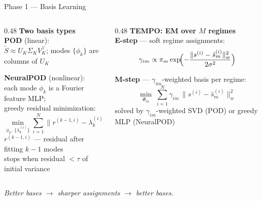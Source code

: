 \documentclass[aspectratio=169]{beamer}
\begin{document}
\begin{frame}{Phase 1 — Basis Learning}

\begin{columns}[T]
\begin{column}{0.48\textwidth}
  \small\textbf{Two basis types}\\[6pt]

  \textbf{POD} (linear):\\
  $\tilde{S} \approx U_K\Sigma_K V_K^\top$;\enspace
  modes $\{\phi_k\}$ are columns of $U_K$

  \medskip
  \textbf{NeuralPOD} (nonlinear):\\
  each mode $\phi_k$ is a Fourier feature MLP;\\
  greedy residual minimization:
  \[
    \min_{\phi_k,\,\{\lambda_k^{(i)}\}}
    \sum_{i=1}^N \bigl\|r^{(k-1,i)} - \lambda_k^{(i)}\phi_k\bigr\|_w^2
  \]
  {\footnotesize $r^{(k-1,i)}$ — residual after fitting $k{-}1$ modes}\\[2pt]
  stops when residual $<\tau$ of initial variance
\end{column}
\begin{column}{0.48\textwidth}
  \small\textbf{TEMPO: EM over $M$ regimes}\\[6pt]

  \textbf{E-step} — soft regime assignments:
  \[
    \gamma_{im} \propto \pi_m
    \exp\!\Bigl(-\frac{\|s^{(i)}-\hat{s}_m^{(i)}\|_w^2}{2\sigma^2}\Bigr)
  \]

  \medskip
  \textbf{M-step} — $\gamma_{im}$-weighted basis per regime:
  \[
    \min_{\Phi_m}\;\sum_{i=1}^N
    \gamma_{im}\,\|s^{(i)}-\hat{s}_m^{(i)}\|_w^2
  \]
  solved by $\gamma_{im}$-weighted SVD (POD) or greedy MLP (NeuralPOD)
\end{column}
\end{columns}

\vspace{0.2cm}
\begin{center}
{\footnotesize\itshape Better bases $\to$ sharper assignments $\to$ better bases.}
\end{center}

\end{frame}
\end{document}
